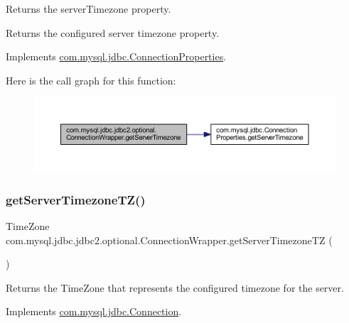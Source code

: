 Returns the \textquotesingle{}server\+Timezone\textquotesingle{} property.

\begin{DoxyReturn}{Returns}
the configured server timezone property. 
\end{DoxyReturn}


Implements \mbox{\hyperlink{interfacecom_1_1mysql_1_1jdbc_1_1_connection_properties_a488c241668bba62e720eea31fde52512}{com.\+mysql.\+jdbc.\+Connection\+Properties}}.

Here is the call graph for this function\+:
\nopagebreak
\begin{figure}[H]
\begin{center}
\leavevmode
\includegraphics[width=350pt]{classcom_1_1mysql_1_1jdbc_1_1jdbc2_1_1optional_1_1_connection_wrapper_a170059c98c792a038932db8bb5b0bd2b_cgraph}
\end{center}
\end{figure}
\mbox{\label{classcom_1_1mysql_1_1jdbc_1_1jdbc2_1_1optional_1_1_connection_wrapper_a2c40120ec4b0435a9e26955ee5d82c0d}} 
\subsubsection{\texorpdfstring{get\+Server\+Timezone\+T\+Z()}{getServerTimezoneTZ()}}
{\footnotesize\ttfamily Time\+Zone com.\+mysql.\+jdbc.\+jdbc2.\+optional.\+Connection\+Wrapper.\+get\+Server\+Timezone\+TZ (\begin{DoxyParamCaption}{ }\end{DoxyParamCaption})}

Returns the Time\+Zone that represents the configured timezone for the server. 

Implements \mbox{\hyperlink{interfacecom_1_1mysql_1_1jdbc_1_1_connection_aa824ea2a868be95bd6a21119445838b8}{com.\+mysql.\+jdbc.\+Connection}}.


